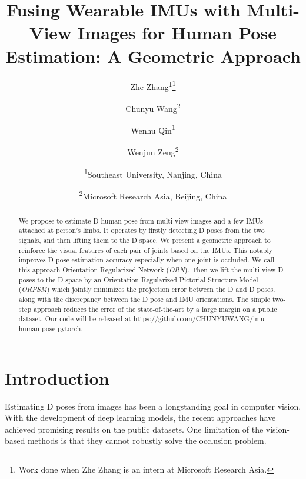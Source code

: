 \documentclass[10pt,twocolumn,letterpaper]{article}
\begin{document}
\title{Fusing Wearable IMUs with Multi-View Images for Human Pose Estimation: A Geometric Approach}
\author{Zhe Zhang\textsuperscript{1}\thanks{Work done when Zhe Zhang is an intern at Microsoft Research Asia.}\\
\and
Chunyu Wang\textsuperscript{2}\\
\and
Wenhu Qin\textsuperscript{1}\\
\and
Wenjun Zeng\textsuperscript{2}\\
\and
\textsuperscript{1}Southeast University, Nanjing, China
\and
\textsuperscript{2}Microsoft Research Asia, Beijing, China
}

\maketitle



\begin{abstract}
We propose to estimate D human pose from multi-view images and a few IMUs attached at person's limbs. It operates by firstly detecting D poses from the two signals, and then lifting them to the D space. We present a geometric approach to reinforce the visual features of each pair of joints based on the IMUs. This notably improves D pose estimation accuracy especially when one joint is occluded. We call this approach Orientation Regularized Network (\emph{ORN}).  Then we lift the multi-view D poses to the D space by an Orientation Regularized Pictorial Structure Model (\emph{ORPSM}) which jointly minimizes the projection error between the D and D poses, along with the discrepancy between the D pose and IMU {orientations}. The simple two-step approach reduces the error of the state-of-the-art by a large margin on a public dataset. Our code will be released at \url{https://github.com/CHUNYUWANG/imu-human-pose-pytorch}.

\end{abstract}




\section{Introduction}

Estimating D poses from images has been a longstanding goal in computer vision. With the development of deep learning models, the recent approaches \cite{gall2010optimization,PavlakosZDD17,belagiannis20143D,Rhodin_2018_ECCV,rhodin2018learning,trumble2018deep} have achieved promising results on the public datasets. One limitation of the vision-based methods is that they cannot robustly solve the occlusion problem. 
\end{document}
